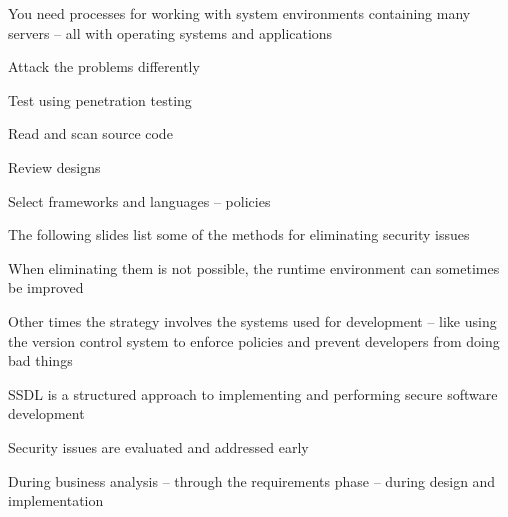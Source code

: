 \documentclass[Screen16to9,17pt]{foils}
\begin{document}


You need processes for working with system environments containing many servers -- all with operating systems and applications

Attack the problems differently
\begin{list2}
\item Test using penetration testing
\item Read and scan source code
\item Review designs
\item Select frameworks and languages -- policies
\end{list2}


\begin{list2}
\item The following slides list some of the methods for eliminating security issues
\item When eliminating them is not possible, the runtime environment can sometimes be improved
\item Other times the strategy involves the systems used for development -- like using the version control system to enforce policies and prevent developers from doing bad things
\end{list2}



\begin{list2}
\item SSDL is a structured approach to implementing and performing secure software development
\item Security issues are evaluated and addressed early
\item During business analysis -- through the requirements phase -- during design and implementation
\end{list2}

\end{document}
